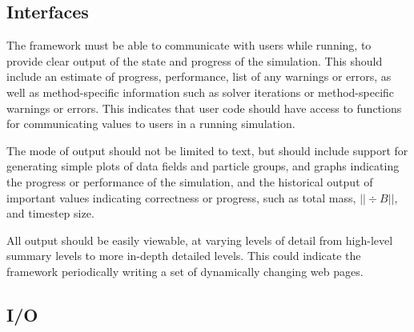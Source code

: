 \documentclass{article}
\begin{document}
\subsection{Interfaces}

The framework must be able to communicate with users while running, to
provide clear output of the state and progress of the simulation.
This should include an estimate of progress, performance, list of any
warnings or errors, as well as method-specific information such as
solver iterations or method-specific warnings or errors.  This
indicates that user code should have access to functions for
communicating values to users in a running simulation.

The mode of output should not be limited to text, but should include
support for generating simple plots of data fields and particle
groups, and graphs indicating the progress or performance of the
simulation, and the historical output of important values indicating
correctness or progress, such as total mass, $||\div B||$, and
timestep size.

All output should be easily viewable, at varying levels of detail from
high-level summary levels to more in-depth detailed levels.  This
could indicate the framework periodically writing a set of dynamically
changing web pages.



\subsection{I/O }
\end{document}
